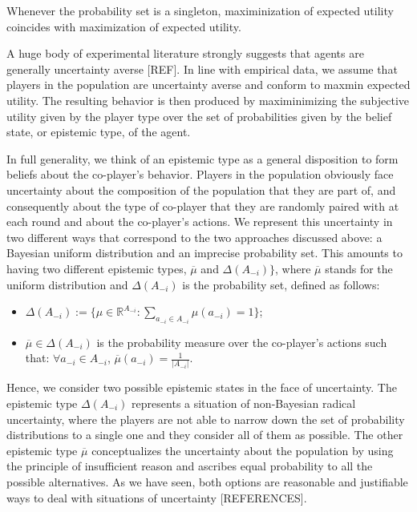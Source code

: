 \documentclass[fleqn,reqno,11pt]{article}
\begin{document}
\begin{fact} \label{fact:singleton probability set}
Whenever the probability set is a singleton, maximinization of
expected utility coincides with maximization of expected utility.
\end{fact}

A huge body of experimental literature strongly suggests that agents are generally uncertainty
averse [REF]. In line with empirical data,
we assume that players in the population are uncertainty averse and conform to maxmin expected
utility. The resulting behavior is then produced by maximinimizing the subjective utility
given by the player type over the set of probabilities given by the belief state, or epistemic type, of the agent.

In full generality, we think of an epistemic type as a general disposition to form beliefs about the co-player’s behavior.    Players in the population obviously face uncertainty about the composition of the population that they are part of, and consequently about the type of co-player that they are randomly paired with at each round and about the co-player's actions. We represent this uncertainty in two different ways that correspond to the two approaches discussed above: a Bayesian uniform distribution and an imprecise probability set. This amounts to having two different epistemic types, $ \overline{\mu}$ and $ \Delta(A_{-i}) \rbrace $, where $\overline{\mu}$ stands for the uniform distribution and $\Delta(A_{-i})$ is the probability set, defined as follows:

\begin{itemize}

\item $ \Delta(A_{-i}):=\lbrace \mu \in \mathbb{R}^{A_{-i}}: \sum_{a_{-i} \in A_{-i}} \mu(a_{-i}) = 1 \rbrace$;

\item $\overline{\mu} \in \Delta(A_{-i})$ is the probability measure over the co-player's actions such that: $\forall a_{-i} \in A_{-i}$, $\overline{\mu}(a_{-i})= \frac{1}{|A_{-i}|}$.

\end{itemize} 

Hence, we consider two possible epistemic states in the face of uncertainty. The epistemic type $\Delta(A_{-i})$ represents a situation of non-Bayesian radical uncertainty, where the players are not able to narrow down the set of probability distributions to a single one and they consider all of them as possible. The other epistemic type $\overline{\mu}$ conceptualizes the uncertainty about the population by using the principle of insufficient reason and ascribes equal probability to all the possible alternatives. As we have seen, both options are reasonable and justifiable ways to deal with situations of uncertainty [REFERENCES]. \\
\end{document}
